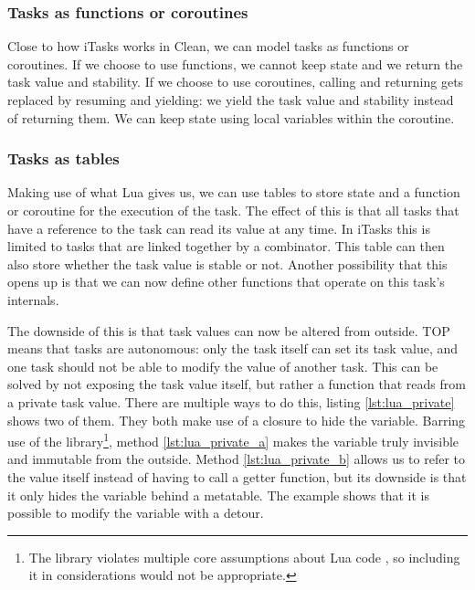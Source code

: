 \subsubsection{Tasks as functions or coroutines}
Close to how iTasks works in Clean, we can model tasks as functions or coroutines. If we choose to use functions, we cannot keep state and we return the task value and stability. If we choose to use coroutines, calling and returning gets replaced by resuming and yielding: we yield the task value and stability instead of returning them. We can keep state using local variables within the coroutine.

\subsubsection{Tasks as tables}
Making use of what Lua gives us, we can use tables to store state and a function or coroutine for the execution of the task. The effect of this is that all tasks that have a reference to the task can read its value at any time. In iTasks this is limited to tasks that are linked together by a combinator. This table can then also store whether the task value is stable or not. Another possibility that this opens up is that we can now define other functions that operate on this task's internals.

The downside of this is that task values can now be altered from outside. TOP means that tasks are autonomous: only the task itself can set its task value, and one task should not be able to modify the value of another task. This can be solved by not exposing the task value itself, but rather a function that reads from a private task value. There are multiple ways to do this, listing \ref{lst:lua_private} shows two of them. They both make use of a closure to hide the variable. Barring use of the  library\footnote{The  library violates multiple core assumptions about Lua code \cite{luareferencemanual}, so including it in considerations would not be appropriate.}, method \ref{lst:lua_private_a} makes the  variable truly invisible and immutable from the outside. Method \ref{lst:lua_private_b} allows us to refer to the value itself instead of having to call a getter function, but its downside is that it only hides the  variable behind a metatable. The example shows that it is possible to modify the variable with a detour.

